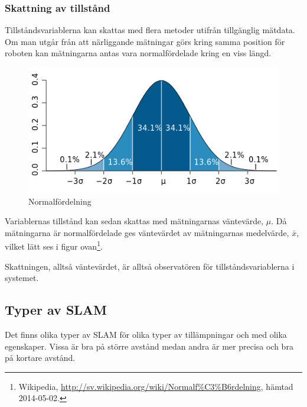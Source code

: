 \documentclass[a4paper,12pt,fleqn]{article}
\begin{document}
\subsubsection{Skattning av tillstånd}

Tillståndsvariablerna kan skattas med flera metoder utifrån tillgänglig mätdata. Om man utgår från att närliggande mätningar görs kring samma position för roboten kan mätningarna antas vara normalfördelade kring en viss längd. 

\begin{figure}[htp] %
  \begin{center}
  \includegraphics[keepaspectratio=true,scale=0.5]{normalfordelning.png}  %
  \end{center}
  \caption{Normalfördelning} %
  \label{fig:fire} %
\end{figure}

Variablernas tillstånd kan sedan skattas med mätningarnas väntevärde, $\mu$. Då mätningarna är normalfördelade ges väntevärdet av mätningarnas medelvärde, $\bar{x}$, vilket lätt ses i figur ovan\footnote{Wikipedia, \url{http://sv.wikipedia.org/wiki/Normalf\%C3\%B6rdelning}, hämtad 2014-05-02.}. 

Skattningen, alltså väntevärdet, är alltså observatören för tillståndsvariablerna i systemet. 

\newpage
\subsection{Typer av SLAM}
Det finns olika typer av SLAM för olika typer av tillämpningar och med olika egenskaper. Vissa är bra på större avstånd medan andra är mer precisa och bra på kortare avstånd. 
\end{document}
